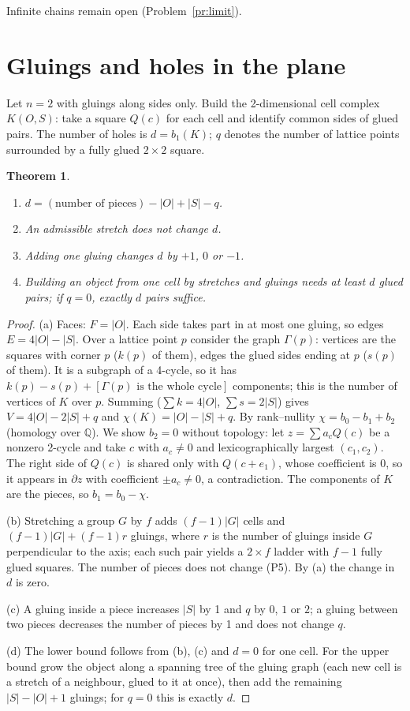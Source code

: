 \documentclass[11pt,a4paper]{article}
\theoremstyle{plain}
\newtheorem{theorem}{Theorem}
\theoremstyle{definition}
\theoremstyle{remark}
\begin{document}
Infinite chains remain open (Problem~\ref{pr:limit}).

\section{Gluings and holes in the plane}\label{sec:holes}

Let $n=2$ with gluings along sides only. Build the 2-dimensional cell complex $K(O,S)$: take a square $Q(c)$ for each cell and identify common sides of glued pairs. The number of holes is $d=b_1(K)$; $q$ denotes the number of lattice points surrounded by a fully glued $2\times2$ square.

\begin{theorem}\label{thm:holes}
\begin{enumerate}[label=\upshape(\alph*)]
\item $d=(\text{number of pieces})-|O|+|S|-q$.
\item An admissible stretch does not change $d$.
\item Adding one gluing changes $d$ by $+1$, $0$ or $-1$.
\item Building an object from one cell by stretches and gluings needs at least $d$ glued pairs; if $q=0$, exactly $d$ pairs suffice.
\end{enumerate}
\end{theorem}
\begin{proof}
(a) Faces: $F=|O|$. Each side takes part in at most one gluing, so edges $E=4|O|-|S|$. Over a lattice point $p$ consider the graph $\Gamma(p)$: vertices are the squares with corner $p$ ($k(p)$ of them), edges the glued sides ending at $p$ ($s(p)$ of them). It is a subgraph of a 4-cycle, so it has $k(p)-s(p)+[\Gamma(p)\text{ is the whole cycle}]$ components; this is the number of vertices of $K$ over $p$. Summing ($\sum k=4|O|$, $\sum s=2|S|$) gives $V=4|O|-2|S|+q$ and $\chi(K)=|O|-|S|+q$. By rank–nullity $\chi=b_0-b_1+b_2$ (homology over $\mathbb Q$). We show $b_2=0$ without topology: let $z=\sum a_cQ(c)$ be a nonzero 2-cycle and take $c$ with $a_c\ne0$ and lexicographically largest $(c_1,c_2)$. The right side of $Q(c)$ is shared only with $Q(c+e_1)$, whose coefficient is $0$, so it appears in $\partial z$ with coefficient $\pm a_c\ne0$, a contradiction. The components of $K$ are the pieces, so $b_1=b_0-\chi$.

(b) Stretching a group $G$ by $f$ adds $(f-1)|G|$ cells and $(f-1)|G|+(f-1)r$ gluings, where $r$ is the number of gluings inside $G$ perpendicular to the axis; each such pair yields a $2\times f$ ladder with $f-1$ fully glued squares. The number of pieces does not change (P5). By (a) the change in $d$ is zero.

(c) A gluing inside a piece increases $|S|$ by 1 and $q$ by $0$, $1$ or $2$; a gluing between two pieces decreases the number of pieces by 1 and does not change $q$.

(d) The lower bound follows from (b), (c) and $d=0$ for one cell. For the upper bound grow the object along a spanning tree of the gluing graph (each new cell is a stretch of a neighbour, glued to it at once), then add the remaining $|S|-|O|+1$ gluings; for $q=0$ this is exactly $d$.
\end{proof}
\end{document}
